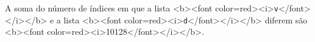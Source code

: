 \documentclass[12pt,varwidth=16cm,border=1pt]{standalone}
\begin{document}
A soma do número de índices em que a lista <b><font color=red><i>\verb+v+</font></i></b> e a lista <b><font color=red><i>\verb+d+</font></i></b> diferem são <b><font color=red><i>10128</font></i></b>.

\questiomtrue
\end{document}
